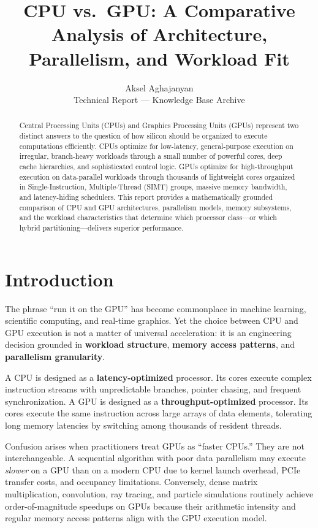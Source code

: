 \documentclass[11pt,journal,onecolumn]{IEEEtran}
\begin{document}
\title{CPU vs.\ GPU: A Comparative Analysis of Architecture, Parallelism, and Workload Fit}

\author{Aksel Aghajanyan \\ \small Technical Report --- Knowledge Base Archive}

\maketitle

\begin{abstract}
Central Processing Units (CPUs) and Graphics Processing Units (GPUs) represent two distinct answers to the question of how silicon should be organized to execute computations efficiently. CPUs optimize for low-latency, general-purpose execution on irregular, branch-heavy workloads through a small number of powerful cores, deep cache hierarchies, and sophisticated control logic. GPUs optimize for high-throughput execution on data-parallel workloads through thousands of lightweight cores organized in Single-Instruction, Multiple-Thread (SIMT) groups, massive memory bandwidth, and latency-hiding schedulers. This report provides a mathematically grounded comparison of CPU and GPU architectures, parallelism models, memory subsystems, and the workload characteristics that determine which processor class---or which hybrid partitioning---delivers superior performance.
\end{abstract}

\section{Introduction}
The phrase ``run it on the GPU'' has become commonplace in machine learning, scientific computing, and real-time graphics. Yet the choice between CPU and GPU execution is not a matter of universal acceleration: it is an engineering decision grounded in \textbf{workload structure}, \textbf{memory access patterns}, and \textbf{parallelism granularity}.

A CPU is designed as a \textbf{latency-optimized} processor. Its cores execute complex instruction streams with unpredictable branches, pointer chasing, and frequent synchronization. A GPU is designed as a \textbf{throughput-optimized} processor. Its cores execute the same instruction across large arrays of data elements, tolerating long memory latencies by switching among thousands of resident threads.

Confusion arises when practitioners treat GPUs as ``faster CPUs.'' They are not interchangeable. A sequential algorithm with poor data parallelism may execute \emph{slower} on a GPU than on a modern CPU due to kernel launch overhead, PCIe transfer costs, and occupancy limitations. Conversely, dense matrix multiplication, convolution, ray tracing, and particle simulations routinely achieve order-of-magnitude speedups on GPUs because their arithmetic intensity and regular memory access patterns align with the GPU execution model.
\end{document}
